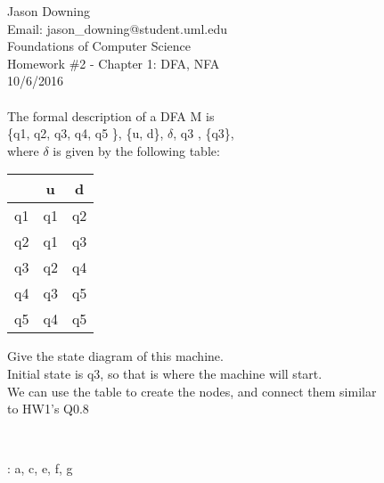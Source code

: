 \documentclass[12pt]{article}
\begin{document}
\noindent
Jason Downing \\
Email: jason\_downing@student.uml.edu \\
Foundations of Computer Science \\
Homework \#2 - Chapter 1: DFA, NFA\\
10/6/2016 \\

 \\
The formal description of a DFA M is \\
\{q1, q2, q3, q4, q5 \}, \{u, d\}, $\delta$, q3 , \{q3\}, \\
where $\delta$  is given by the following table:
\begin{center}
\begin{tabular}{ c | c c }
 & u & d \\
\hline
 q1 & q1 & q2 \\ 
 q2 & q1 & q3 \\  
 q3 & q2 & q4 \\
 q4 & q3 & q5 \\
 q5 & q4 & q5
\end{tabular}
\end{center}

\noindent
Give the state diagram of this machine.	\\

\noindent
Initial state is q3, so that is where the machine will start. \\
We can use the table to create the nodes, and connect them similar \\
to HW1's Q0.8 \\

\begin{center}
 \\
\end{center}


: a, c, e, f, g \\
\end{document}
